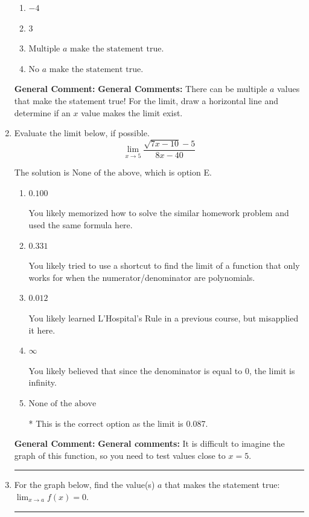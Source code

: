 \documentclass{extbook}[14pt]
\newcommand{\litem}[1]{\item #1

\rule{\textwidth}{0.4pt}}
\begin{document}
\begin{enumerate}
{\begin{enumerate}[label=\Alph*.]
\item \( -4 \)


\item \( 3 \)


\item \( \text{Multiple } a \text{ make the statement true}. \)


\item \( \text{No } a \text{ make the statement true}. \)


\end{enumerate}

\textbf{General Comment:} \textbf{General Comments:} There can be multiple $a$ values that make the statement true! For the limit, draw a horizontal line and determine if an $x$ value makes the limit exist.
}
\litem{
Evaluate the limit below, if possible.
\[ \lim_{x \rightarrow 5} \frac{\sqrt{7x - 10} - 5}{8x - 40} \]

The solution is \( \text{None of the above} \), which is option E.\begin{enumerate}[label=\Alph*.]
\item \( 0.100 \)

You likely memorized how to solve the similar homework problem and used the same formula here.
\item \( 0.331 \)

You likely tried to use a shortcut to find the limit of a function that only works for when the numerator/denominator are polynomials.
\item \( 0.012 \)

You likely learned L'Hospital's Rule in a previous course, but misapplied it here.
\item \( \infty \)

You likely believed that since the denominator is equal to 0, the limit is infinity.
\item \( \text{None of the above} \)

* This is the correct option as the limit is 0.087.
\end{enumerate}

\textbf{General Comment:} \textbf{General comments:} It is difficult to imagine the graph of this function, so you need to test values close to $x = 5$.
}
\litem{
For the graph below, find the value(s) $a$ that makes the statement true: $ \displaystyle \lim_{x \rightarrow a} f(x) = 0$.

}
\end{enumerate}
\end{document}
